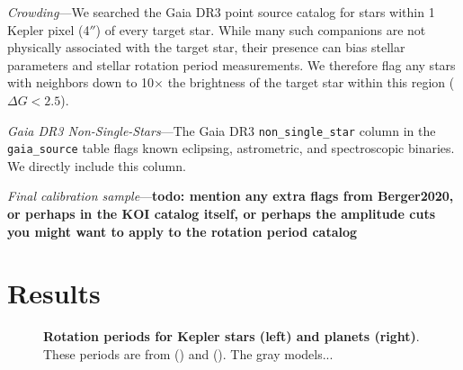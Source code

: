 \documentclass[11pt,twocolumn,tighten]{aastex63}
\begin{document}
{\it Crowding}---We searched the Gaia DR3 point source catalog for
stars within 1 Kepler pixel (4$''$) of every target star.
While many such companions are not physically associated with the
target star, their presence can bias stellar parameters and stellar
rotation period measurements.
We therefore flag any stars with neighbors down to 10$\times$ the 
brightness of the target star within this region ($\Delta G < 2.5$).

{\it Gaia DR3 Non-Single-Stars}---The Gaia DR3
\texttt{non\_single\_star} column in the \texttt{gaia\_source} table
flags known eclipsing, astrometric, and spectroscopic binaries.  We
directly include this column.

{\it Final calibration sample}---{\bf todo: mention any extra flags
from Berger2020, or perhaps in the KOI catalog itself, or perhaps the
amplitude cuts you might want to apply to the rotation period catalog}






\section{Results}
\label{sec:results}

\begin{figure*}[!t]
	\begin{center}
		\vspace{-0.62cm}
	\end{center}
	\vspace{-0.5cm}
	\caption{
    {\bf Rotation periods for Kepler stars (left) and planets (right)}.
    These periods are from \citet{Santos_2019}
    () and \citet{Santos_2021}
    ().
    The gray models... %
	}
	\label{fig:prot_vs_teff}
\end{figure*}
\end{document}
